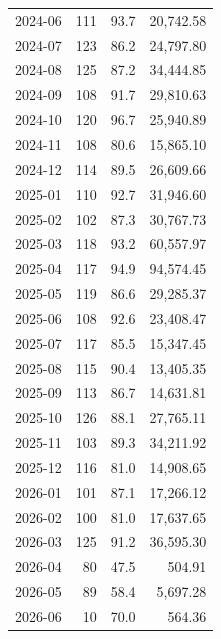 \documentclass[11pt,a4paper,twoside]{article}
\begin{document}
\begin{center}
\begin{tabular}{>{\color{txtmain}}l rrr}
2024-06 & 111 & 93.7 & \textcolor{wingreen}{20,742.58} \\
2024-07 & 123 & 86.2 & \textcolor{wingreen}{24,797.80} \\
2024-08 & 125 & 87.2 & \textcolor{wingreen}{34,444.85} \\
2024-09 & 108 & 91.7 & \textcolor{wingreen}{29,810.63} \\
2024-10 & 120 & 96.7 & \textcolor{wingreen}{25,940.89} \\
2024-11 & 108 & 80.6 & \textcolor{wingreen}{15,865.10} \\
2024-12 & 114 & 89.5 & \textcolor{wingreen}{26,609.66} \\
2025-01 & 110 & 92.7 & \textcolor{wingreen}{31,946.60} \\
2025-02 & 102 & 87.3 & \textcolor{wingreen}{30,767.73} \\
2025-03 & 118 & 93.2 & \textcolor{wingreen}{60,557.97} \\
2025-04 & 117 & 94.9 & \textcolor{wingreen}{94,574.45} \\
2025-05 & 119 & 86.6 & \textcolor{wingreen}{29,285.37} \\
2025-06 & 108 & 92.6 & \textcolor{wingreen}{23,408.47} \\
2025-07 & 117 & 85.5 & \textcolor{wingreen}{15,347.45} \\
2025-08 & 115 & 90.4 & \textcolor{wingreen}{13,405.35} \\
2025-09 & 113 & 86.7 & \textcolor{wingreen}{14,631.81} \\
2025-10 & 126 & 88.1 & \textcolor{wingreen}{27,765.11} \\
2025-11 & 103 & 89.3 & \textcolor{wingreen}{34,211.92} \\
2025-12 & 116 & 81.0 & \textcolor{wingreen}{14,908.65} \\
2026-01 & 101 & 87.1 & \textcolor{wingreen}{17,266.12} \\
2026-02 & 100 & 81.0 & \textcolor{wingreen}{17,637.65} \\
2026-03 & 125 & 91.2 & \textcolor{wingreen}{36,595.30} \\
2026-04 & 80 & 47.5 & \textcolor{wingreen}{504.91} \\
2026-05 & 89 & 58.4 & \textcolor{wingreen}{5,697.28} \\
2026-06 & 10 & 70.0 & \textcolor{wingreen}{564.36} \\
\bottomrule
\end{tabular}
\end{center}
\end{document}
